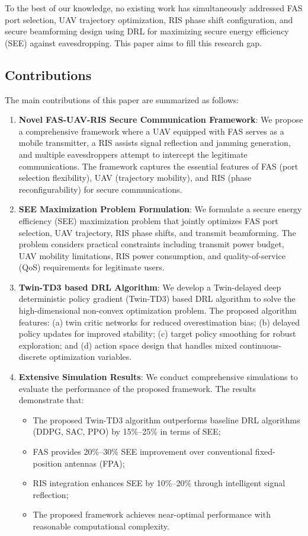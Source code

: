 To the best of our knowledge, no existing work has simultaneously addressed FAS port selection, UAV trajectory optimization, RIS phase shift configuration, and secure beamforming design using DRL for maximizing secure energy efficiency (SEE) against eavesdropping. This paper aims to fill this research gap.

\subsection{Contributions}

The main contributions of this paper are summarized as follows:

\begin{enumerate}
    \item \textbf{Novel FAS-UAV-RIS Secure Communication Framework}: We propose a comprehensive framework where a UAV equipped with FAS serves as a mobile transmitter, a RIS assists signal reflection and jamming generation, and multiple eavesdroppers attempt to intercept the legitimate communications. The framework captures the essential features of FAS (port selection flexibility), UAV (trajectory mobility), and RIS (phase reconfigurability) for secure communications.

    \item \textbf{SEE Maximization Problem Formulation}: We formulate a secure energy efficiency (SEE) maximization problem that jointly optimizes FAS port selection, UAV trajectory, RIS phase shifts, and transmit beamforming. The problem considers practical constraints including transmit power budget, UAV mobility limitations, RIS power consumption, and quality-of-service (QoS) requirements for legitimate users.

    \item \textbf{Twin-TD3 based DRL Algorithm}: We develop a Twin-delayed deep deterministic policy gradient (Twin-TD3) based DRL algorithm to solve the high-dimensional non-convex optimization problem. The proposed algorithm features: (a) twin critic networks for reduced overestimation bias; (b) delayed policy updates for improved stability; (c) target policy smoothing for robust exploration; and (d) action space design that handles mixed continuous-discrete optimization variables.

    \item \textbf{Extensive Simulation Results}: We conduct comprehensive simulations to evaluate the performance of the proposed framework. The results demonstrate that:
    \begin{itemize}
        \item The proposed Twin-TD3 algorithm outperforms baseline DRL algorithms (DDPG, SAC, PPO) by 15\%--25\% in terms of SEE;
        \item FAS provides 20\%--30\% SEE improvement over conventional fixed-position antennas (FPA);
        \item RIS integration enhances SEE by 10\%--20\% through intelligent signal reflection;
        \item The proposed framework achieves near-optimal performance with reasonable computational complexity.
    \end{itemize}
\end{enumerate}

